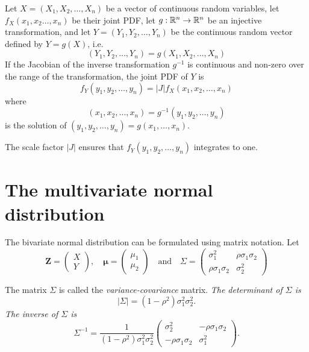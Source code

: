 \begin{theorem}\label{thm:transf_injective_joint_continuous}
Let $X=(X_1,X_2,\ldots,X_n)$ be a vector of continuous random variables, let $f_X(x_1,x_2\ldots,x_n)$ be their joint PDF, let $g:\mathbb{R}^n\to\mathbb{R}^n$ be an injective transformation, and let $Y=(Y_1,Y_2,\ldots,Y_n)$ be the continuous random vector defined by $Y=g(X)$, i.e.\
\[
(Y_1,Y_2,\ldots,Y_n) = g(X_1,X_2,\ldots,X_n)
\]
If the Jacobian of the inverse transformation $g^{-1}$ is continuous and non-zero over the range of the transformation, the joint PDF of $Y$ is
\[
f_Y(y_1,y_2,\ldots,y_n) = |J| f_X(x_1,x_2,\ldots,x_n)
\]
where 
\[
(x_1,x_2,\ldots,x_n)=g^{-1}(y_1,y_2,\ldots,y_n)
\]
is the solution of $(y_1,y_2,\ldots,y_n)=g(x_1,\ldots,x_n)$.
\end{theorem}

\begin{remark}
The scale factor $|J|$ ensures that $f_Y(y_1,y_2,\ldots,y_n)$ integrates to one.
\end{remark}


\section{The multivariate normal distribution} 
The bivariate normal distribution can be formulated using matrix notation. Let
\[
\mathbf{Z}		= \begin{pmatrix} X \\ Y \end{pmatrix},\quad
\mathbf{\mu}	= \begin{pmatrix} \mu_1 \\ \mu_2 \end{pmatrix}\quad\text{and}\quad
\Sigma			= \begin{pmatrix} \sigma^2_1 & \rho\sigma_1\sigma_2 \\ \rho\sigma_1\sigma_2 & \sigma^2_2 \end{pmatrix}
\]

The matrix $\Sigma$ is called the \emph{variance-covariance} matrix.
\bit
\it The determinant of $\Sigma$ is 
\[
|\Sigma| = (1-\rho^2)\sigma^2_1\sigma^2_2.
\]
\it The inverse of $\Sigma$ is
\[
\Sigma^{-1} = \frac{1}{(1-\rho^2)\sigma^2_1\sigma^2_2}
\begin{pmatrix} 
	\sigma^2_2  				& -\rho\sigma_1\sigma_2 \\
	-\rho\sigma_1\sigma_2	& \sigma^2_1
\end{pmatrix}.
\]
\eit

